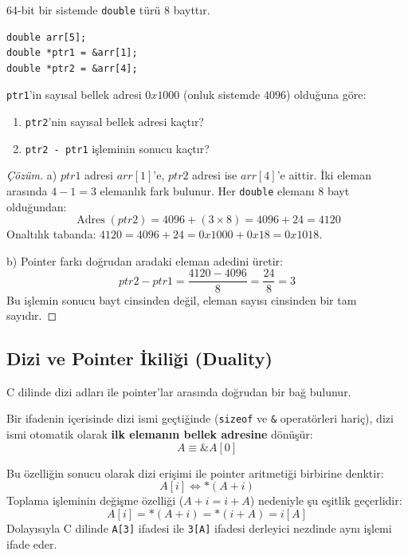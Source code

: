 \begin{example}
64-bit bir sistemde \texttt{double} türü 8 bayttır.
\begin{lstlisting}[language=CTemel]
double arr[5];
double *ptr1 = &arr[1];
double *ptr2 = &arr[4];
\end{lstlisting}
\texttt{ptr1}'in sayısal bellek adresi $0x1000$ (onluk sistemde $4096$) olduğuna göre:
\begin{enumerate}
    \item[a)] \texttt{ptr2}'nin sayısal bellek adresi kaçtır?
    \item[b)] \texttt{ptr2 - ptr1} işleminin sonucu kaçtır?
\end{enumerate}
\end{example}

\begin{proof}[Çözüm]
a) $ptr1$ adresi $arr[1]$'e, $ptr2$ adresi ise $arr[4]$'e aittir. İki eleman arasında $4 - 1 = 3$ elemanlık fark bulunur. Her \texttt{double} elemanı 8 bayt olduğundan:
\[
\operatorname{Adres}(ptr2) = 4096 + (3 \times 8) = 4096 + 24 = 4120
\]
Onaltılık tabanda: $4120 = 4096 + 24 = 0x1000 + 0x18 = 0x1018$.

b) Pointer farkı doğrudan aradaki eleman adedini üretir:
\[
ptr2 - ptr1 = \frac{4120 - 4096}{8} = \frac{24}{8} = 3
\]
Bu işlemin sonucu bayt cinsinden değil, eleman sayısı cinsinden bir tam sayıdır.
\end{proof}

\subsection{Dizi ve Pointer İkiliği (Duality)}

C dilinde dizi adları ile pointer'lar arasında doğrudan bir bağ bulunur.

\begin{theorem}
Bir ifadenin içerisinde dizi ismi geçtiğinde (\texttt{sizeof} ve \texttt{\&} operatörleri hariç), dizi ismi otomatik olarak \textbf{ilk elemanın bellek adresine} dönüşür:
\[
A \equiv \&A[0]
\]
\end{theorem}

Bu özelliğin sonucu olarak dizi erişimi ile pointer aritmetiği birbirine denktir:
\[
A[i] \iff *(A + i)
\]
Toplama işleminin değişme özelliği ($A + i = i + A$) nedeniyle şu eşitlik geçerlidir:
\[
A[i] = *(A + i) = *(i + A) = i[A]
\]
Dolayısıyla C dilinde \texttt{A[3]} ifadesi ile \texttt{3[A]} ifadesi derleyici nezdinde aynı işlemi ifade eder.

